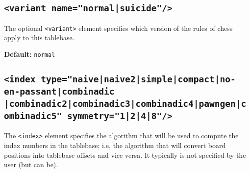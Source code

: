 \documentclass[11pt]{article}
\begin{document}
\subsection{\tt <variant name="normal|suicide"/>}

The optional {\tt <variant>} element specifies which version
of the rules of chess apply to this tablebase.

{\bf Default:} {\tt normal}


\subsection{\tt <index type="naive|naive2|simple|compact|no-en-passant|combinadic \hfil\break\hbox{\qquad\qquad\qquad\qquad} |combinadic2|combinadic3|combinadic4|pawngen|combinadic5" \hfil\break\hbox{\qquad} symmetry="1|2|4|8"/>}

The {\tt <index>} element specifies the algorithm that will be used to
compute the index numbers in the tablebase; i.e, the algorithm that
will convert board positions into tablebase offsets and vice versa.
It typically is not specified by the user (but can be).
\end{document}
